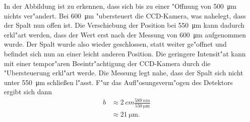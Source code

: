 In der Abbildung ist zu erkennen, dass sich bis zu einer "Offnung von \SI{500}{\micro\metre} nichts ver"andert.
Bei \SI{600}{\micro\metre} "ubersteuert die CCD-Kamera, was nahelegt, dass der Spalt nun offen ist.
Die Verschiebung der Position bei \SI{550}{\micro\metre} kann dadurch erkl"art werden, dass der Wert erst nach der Messung von \SI{600}{\micro\metre} aufgenommen wurde.
Der Spalt wurde also wieder geschlossen, statt weiter ge"offnet und befindet sich nun an einer leicht anderen Position.
Die geringere Intensit"at kann mit einer tempor"aren Beeintr"achtigung der CCD-Kamera durch die "Ubersteuerung erkl"art werde.
Die Messung legt nahe, dass der Spalt sich nicht unter \SI{550}{\micro\metre} schlie{\ss}en l"asst.
F"ur das Aufl"osungsverm"ogen des Detektors ergibt sich dann
\begin{align*}
b
    &\approx \SI{2}{cm}\frac{\SI{589}{nm}}{\SI{550}{\micro\metre}}\\
    &\approx\SI{21}{\micro\metre}.
\end{align*}
